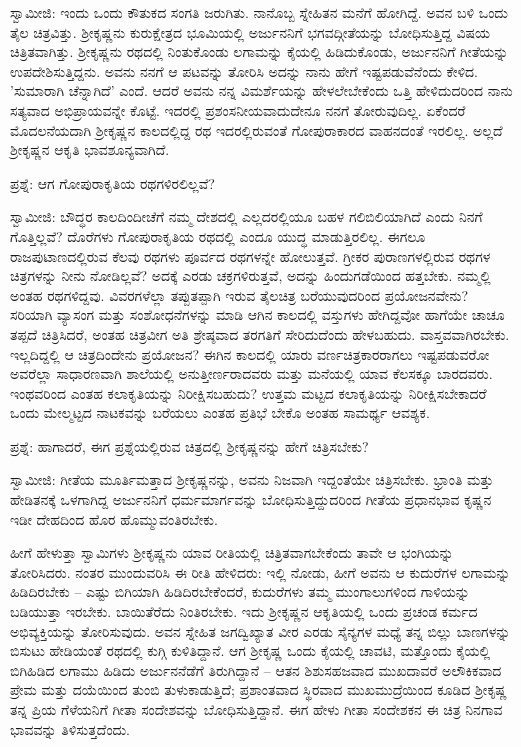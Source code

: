 ಸ್ವಾಮೀಜಿ: ಇಂದು ಒಂದು ಕೌತುಕದ ಸಂಗತಿ ಜರುಗಿತು. ನಾನೊಬ್ಬ ಸ್ನೇಹಿತನ ಮನೆಗೆ ಹೋಗಿದ್ದೆ. ಅವನ ಬಳಿ ಒಂದು ತೈಲ ಚಿತ್ರವಿತ್ತು. ಶ‍್ರೀಕೃಷ್ಣನು ಕುರುಕ್ಷೇತ್ರದ ಭೂಮಿಯಲ್ಲಿ ಅರ್ಜುನನಿಗೆ ಭಗವದ್ಗೀತೆಯನ್ನು ಬೋಧಿಸುತ್ತಿದ್ದ ವಿಷಯ ಚಿತ್ರಿತವಾಗಿತ್ತು. ಶ‍್ರೀಕೃಷ್ಣನು ರಥದಲ್ಲಿ ನಿಂತುಕೊಂಡು ಲಗಾಮನ್ನು ಕೈಯಲ್ಲಿ ಹಿಡಿದುಕೊಂಡು, ಅರ್ಜುನನಿಗೆ ಗೀತೆಯನ್ನು ಉಪದೇಶಿಸುತ್ತಿದ್ದನು. ಅವನು ನನಗೆ ಆ ಪಟವನ್ನು ತೋರಿಸಿ ಅದನ್ನು ನಾನು ಹೇಗೆ ಇಷ್ಟಪಡುವೆನೆಂದು ಕೇಳಿದ. 'ಸುಮಾರಾಗಿ ಚೆನ್ನಾಗಿದೆ' ಎಂದೆ. ಆದರೆ ಅವನು ನನ್ನ ವಿಮರ್ಶೆಯನ್ನು ಹೇಳಲೇಬೇಕೆಂದು ಒತ್ತಿ ಹೇಳಿದುದರಿಂದ ನಾನು ಸತ್ಯವಾದ ಅಭಿಪ್ರಾಯವನ್ನೇ ಕೊಟ್ಟೆ. ಇದರಲ್ಲಿ ಪ್ರಶಂಸನೀಯವಾದುದೇನೂ ನನಗೆ ತೋರುವುದಿಲ್ಲ. ಏಕೆಂದರೆ ಮೊದಲನೆಯದಾಗಿ ಶ‍್ರೀಕೃಷ್ಣನ ಕಾಲದಲ್ಲಿದ್ದ ರಥ ಇದರಲ್ಲಿರುವಂತೆ ಗೋಪುರಾಕಾರದ ವಾಹನದಂತೆ ಇರಲಿಲ್ಲ. ಅಲ್ಲದೆ ಶ‍್ರೀಕೃಷ್ಣನ ಆಕೃತಿ ಭಾವಶೂನ್ಯವಾಗಿದೆ.

ಪ್ರಶ್ನೆ: ಆಗ ಗೋಪುರಾಕೃತಿಯ ರಥಗಳಿರಲಿಲ್ಲವೆ?

ಸ್ವಾಮೀಜಿ: ಬೌದ್ಧರ ಕಾಲದಿಂದೀಚೆಗೆ ನಮ್ಮ ದೇಶದಲ್ಲಿ ಎಲ್ಲದರಲ್ಲಿಯೂ ಬಹಳ ಗಲಿಬಿಲಿಯಾಗಿದೆ ಎಂದು ನಿನಗೆ ಗೊತ್ತಿಲ್ಲವೆ? ದೊರೆಗಳು ಗೋಪುರಾಕೃತಿಯ ರಥದಲ್ಲಿ ಎಂದೂ ಯುದ್ಧ ಮಾಡುತ್ತಿರಲಿಲ್ಲ. ಈಗಲೂ ರಾಜಪುಟಾಣದಲ್ಲಿರುವ ಕೆಲವು ರಥಗಳು ಪೂರ್ವದ ರಥಗಳನ್ನೇ ಹೋಲುತ್ತವೆ. ಗ್ರೀಕರ ಪುರಾಣಗಳಲ್ಲಿರುವ ರಥಗಳ ಚಿತ್ರಗಳನ್ನು ನೀನು ನೋಡಿಲ್ಲವೆ? ಅದಕ್ಕೆ ಎರಡು ಚಕ್ರಗಳಿರುತ್ತವೆ, ಅದನ್ನು ಹಿಂದುಗಡೆಯಿಂದ ಹತ್ತಬೇಕು. ನಮ್ಮಲ್ಲಿ ಅಂತಹ ರಥಗಳಿದ್ದವು. ವಿವರಗಳೆಲ್ಲಾ ತಪ್ಪುತಪ್ಪಾಗಿ ಇರುವ ತೈಲಚಿತ್ರ ಬರೆಯುವುದರಿಂದ ಪ್ರಯೋಜನವೇನು? ಸರಿಯಾಗಿ ವ್ಯಾಸಂಗ ಮತ್ತು ಸಂಶೋಧನೆಗಳನ್ನು ಮಾಡಿ ಆಗಿನ ಕಾಲದಲ್ಲಿ ವಸ್ತುಗಳು ಹೇಗಿದ್ದವೋ ಹಾಗೆಯೇ ಚಾಚೂ ತಪ್ಪದೆ ಚಿತ್ರಿಸಿದರೆ, ಅಂತಹ ಚಿತ್ರವೀಗ ಅತಿ ಶ್ರೇಷ್ಠವಾದ ತರಗತಿಗೆ ಸೇರಿದುದೆಂದು ಹೇಳಬಹುದು. ವಾಸ್ತವವಾಗಿರಬೇಕು. ಇಲ್ಲದಿದ್ದಲ್ಲಿ ಆ ಚಿತ್ರದಿಂದೇನು ಪ್ರಯೋಜನ? ಈಗಿನ ಕಾಲದಲ್ಲಿ ಯಾರು ವರ್ಣಚಿತ್ರಕಾರರಾಗಲು ಇಷ್ಟಪಡುವರೋ ಅವರೆಲ್ಲಾ ಸಾಧಾರಣವಾಗಿ ಶಾಲೆಯಲ್ಲಿ ಅನುತ್ತೀರ್ಣರಾದವರು ಮತ್ತು ಮನೆಯಲ್ಲಿ ಯಾವ ಕೆಲಸಕ್ಕೂ ಬಾರದವರು. ಇಂಥವರಿಂದ ಎಂತಹ ಕಲಾಕೃತಿಯನ್ನು ನಿರೀಕ್ಷಿಸಬಹುದು? ಉತ್ತಮ ಮಟ್ಟದ ಕಲಾಕೃತಿಯನ್ನು ನಿರೀಕ್ಷಿಸಬೇಕಾದರೆ ಒಂದು ಮೇಲ್ಮಟ್ಟದ ನಾಟಕವನ್ನು ಬರೆಯಲು ಎಂತಹ ಪ್ರತಿಭೆ ಬೇಕೊ ಅಂತಹ ಸಾಮರ್ಥ್ಯ ಆವಶ್ಯಕ.

ಪ್ರಶ್ನೆ: ಹಾಗಾದರೆ, ಈಗ ಪ್ರಶ್ನೆಯಲ್ಲಿರುವ ಚಿತ್ರದಲ್ಲಿ ಶ‍್ರೀಕೃಷ್ಣನನ್ನು ಹೇಗೆ ಚಿತ್ರಿಸಬೇಕು?

ಸ್ವಾಮೀಜಿ: ಗೀತೆಯ ಮೂರ್ತಿಮತ್ತಾದ ಶ‍್ರೀಕೃಷ್ಣನನ್ನು, ಅವನು ನಿಜವಾಗಿ ಇದ್ದಂತೆಯೇ ಚಿತ್ರಿಸಬೇಕು. ಭ್ರಾಂತಿ ಮತ್ತು ಹೇಡಿತನಕ್ಕೆ ಒಳಗಾಗಿದ್ದ ಅರ್ಜುನನಿಗೆ ಧರ್ಮಮಾರ್ಗವನ್ನು ಬೋಧಿಸುತ್ತಿದ್ದುದರಿಂದ ಗೀತೆಯ ಪ್ರಧಾನಭಾವ ಕೃಷ್ಣನ ಇಡೀ ದೇಹದಿಂದ ಹೊರ ಹೊಮ್ಮುವಂತಿರಬೇಕು.

ಹೀಗೆ ಹೇಳುತ್ತಾ ಸ್ವಾಮಿಗಳು ಶ‍್ರೀಕೃಷ್ಣನು ಯಾವ ರೀತಿಯಲ್ಲಿ ಚಿತ್ರಿತವಾಗಬೇಕೆಂದು ತಾವೇ ಆ ಭಂಗಿಯನ್ನು ತೋರಿಸಿದರು. ನಂತರ ಮುಂದುವರಿಸಿ ಈ ರೀತಿ ಹೇಳಿದರು: ಇಲ್ಲಿ ನೋಡು, ಹೀಗೆ ಅವನು ಆ ಕುದುರೆಗಳ ಲಗಾಮನ್ನು ಹಿಡಿದಿರಬೇಕು – ಎಷ್ಟು ಬಿಗಿಯಾಗಿ ಹಿಡಿದಿರಬೇಕೆಂದರೆ, ಕುದುರೆಗಳು ತಮ್ಮ ಮುಂಗಾಲುಗಳಿಂದ ಗಾಳಿಯನ್ನು ಬಡಿಯುತ್ತಾ ಇರಬೇಕು. ಬಾಯಿತೆರೆದು ನಿಂತಿರಬೇಕು. ಇದು ಶ‍್ರೀಕೃಷ್ಣನ ಆಕೃತಿಯಲ್ಲಿ ಒಂದು ಪ್ರಚಂಡ ಕರ್ಮದ ಅಭಿವ್ಯಕ್ತಿಯನ್ನು ತೋರಿಸುವುದು. ಅವನ ಸ್ನೇಹಿತ ಜಗದ್ವಿಖ್ಯಾತ ವೀರ ಎರಡು ಸೈನ್ಯಗಳ ಮಧ್ಯೆ ತನ್ನ ಬಿಲ್ಲು ಬಾಣಗಳನ್ನು ಬಿಸುಟು ಹೇಡಿಯಂತೆ ರಥದಲ್ಲಿ ಕುಗ್ಗಿ ಕುಳಿತಿದ್ದಾನೆ. ಆಗ ಶ‍್ರೀಕೃಷ್ಣ ಒಂದು ಕೈಯಲ್ಲಿ ಚಾವಟಿ, ಮತ್ತೊಂದು ಕೈಯಲ್ಲಿ ಬಿಗಿಹಿಡಿದ ಲಗಾಮು ಹಿಡಿದು ಅರ್ಜುನನೆಡೆಗೆ ತಿರುಗಿದ್ದಾನೆ – ಆತನ ಶಿಶುಸಹಜವಾದ ಮುಖದಾವರೆ ಅಲೌಕಿಕವಾದ ಪ್ರೇಮ ಮತ್ತು ದಯೆಯಿಂದ ತುಂಬಿ ತುಳುಕಾಡುತ್ತಿದೆ; ಪ್ರಶಾಂತವಾದ ಸ್ಥಿರವಾದ ಮುಖಮುದ್ರೆಯಿಂದ ಕೂಡಿದ ಶ‍್ರೀಕೃಷ್ಣ ತನ್ನ ಪ್ರಿಯ ಗೆಳೆಯನಿಗೆ ಗೀತಾ ಸಂದೇಶವನ್ನು ಬೋಧಿಸುತ್ತಿದ್ದಾನೆ. ಈಗ ಹೇಳು ಗೀತಾ ಸಂದೇಶಕನ ಈ ಚಿತ್ರ ನಿನಗಾವ ಭಾವವನ್ನು ತಿಳಿಸುತ್ತದೆಂದು.

